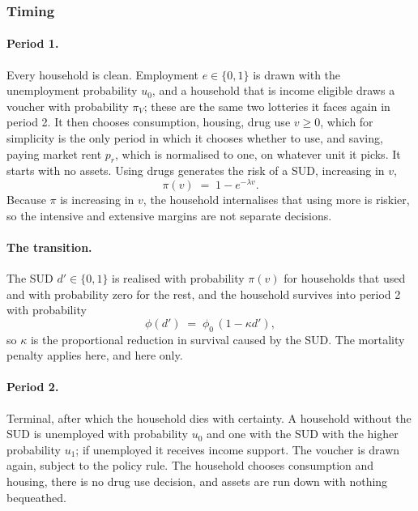 \documentclass[10pt]{article}
\begin{document}
\subsubsection{Timing}


\paragraph{Period 1.} Every household is clean. Employment $e\in\{0,1\}$ is
drawn with the unemployment probability $u_0$, and a household that is income
eligible draws a voucher with probability $\pi_V$; these are the same two
lotteries it faces again in period 2. It then chooses consumption, housing, drug
use $v\ge0$, which for simplicity is the only period in which it chooses whether
to use, and saving, paying market rent $p_r$, which is normalised to one, on
whatever unit it picks. It starts with no assets. Using drugs generates the risk
of a SUD, increasing in $v$,
\begin{equation}\label{eq:hazard}
\pi(v) \;=\; 1 - e^{-\lambda v} .
\end{equation}
Because $\pi$ is increasing in $v$, the household internalises that using more
is riskier, so the intensive and extensive margins are not separate decisions.

\paragraph{The transition.} The SUD $d'\in\{0,1\}$ is realised with
probability $\pi(v)$ for households that used and with probability zero for the
rest, and the household survives into period 2 with probability
\begin{equation}\label{eq:surv}
\phi(d') \;=\; \phi_0\,(1-\kappa d'),
\end{equation}
so $\kappa$ is the proportional reduction in survival caused by the SUD.
The mortality penalty applies here, and here only.

\paragraph{Period 2.} Terminal, after which the household dies with certainty. A
household without the SUD is unemployed with probability $u_0$ and one with
the SUD with the higher probability $u_1$; if unemployed it receives income
support. The voucher is drawn again, subject to the policy rule. The household
chooses consumption and housing, there is no drug use decision, and assets are
run down with nothing bequeathed.
\end{document}
